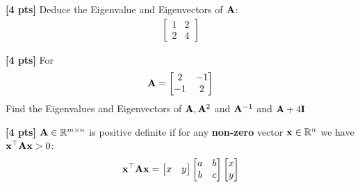 \documentclass[11pt,addpoints,answers]{exam}
\numberwithin{equation}{section} %
\numberwithin{figure}{section} %
\numberwithin{table}{section} %
\begin{document}
\begin{questions}
    \question \textbf{[4 pts]}  Deduce the Eigenvalue and Eigenvectors of $\mathbf{A}$:
    \begin{align*}
        \begin{bmatrix}
            1 & 2 \\ 2 & 4
        \end{bmatrix}
    \end{align*}
    \begin{tcolorbox}[fit,height=3cm, width=\textwidth, blank, borderline={0.5pt}{-2pt},halign=center, valign=center, nobeforeafter]
    \end{tcolorbox}

    \question \textbf{[4 pts]}   For
    \begin{align*}
         \mathbf{A} = \begin{bmatrix}
             2 & -1 \\ -1 & 2
         \end{bmatrix}
     \end{align*}
     Find the Eigenvalues and Eigenvectors of $\mathbf{A}, \mathbf{A}^2$ and $\mathbf{A}^{-1}$ and $\mathbf{A} + 4\mathbf{I}$

    \begin{tcolorbox}[fit,height=6cm, width=\textwidth, blank, borderline={0.5pt}{-2pt},halign=center, valign=center, nobeforeafter]
    \end{tcolorbox}

    \question \textbf{[4 pts]}  $\mathbf{A} \in \mathbb{R}^{m \times n}$ is positive definite if for any \textbf{non-zero} vector $\mathbf{x} \in \mathbb{R}^{n}$  we have $\mathbf{x}^\top \mathbf{A} \mathbf{x} > 0$:
    \begin{align*}
        \mathbf{x}^\top \mathbf{A} \mathbf{x} = \begin{bmatrix}
            x & y
        \end{bmatrix} \begin{bmatrix}
            a & b \\ b & c
        \end{bmatrix}
        \begin{bmatrix}
            x \\ y
        \end{bmatrix}
    \end{align*}


\end{questions}
\end{document}
